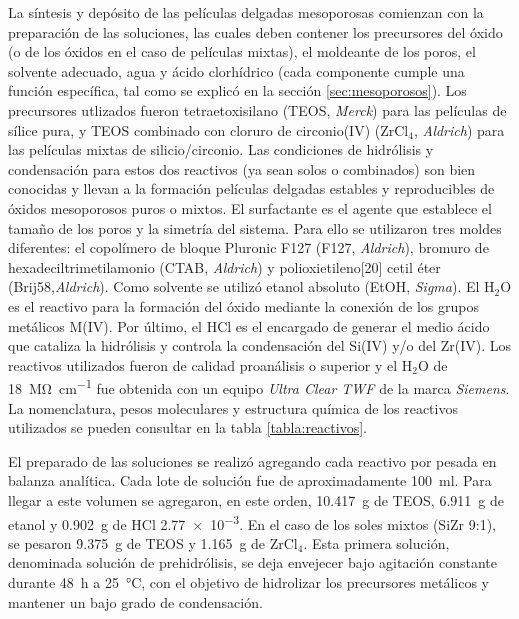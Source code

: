			La síntesis y depósito de las películas delgadas mesoporosas comienzan con la preparación de las soluciones, las cuales deben contener los precursores del óxido (o de los óxidos en el caso de películas mixtas), el moldeante de los poros, el solvente adecuado, agua y ácido clorhídrico\cite{Brinker1990} (cada componente cumple una función específica, tal como se explicó en la sección \ref{sec:mesoporosos}). Los precursores utlizados fueron tetraetoxisilano (TEOS, \textit{Merck}) para las películas de sílice pura, y TEOS combinado con cloruro de circonio(IV) (ZrCl$_4$, \textit{Aldrich}) para las películas mixtas de silicio/circonio. Las condiciones de hidrólisis y condensación para estos dos reactivos (ya sean solos o combinados) son bien conocidas y llevan a la formación películas delgadas estables y reproducibles de óxidos mesoporosos puros o mixtos\cite{Soler-Illia2004,Crepaldi2002a,Angelome2008}. El surfactante es el agente que establece el tamaño de los poros y la simetría del sistema. Para ello se utilizaron tres moldes diferentes: el copolímero de bloque Pluronic F127 (F127, \textit{Aldrich}), bromuro de hexadeciltrimetilamonio (CTAB, \textit{Aldrich}) y polioxietileno[20] cetil éter (Brij58,\textit{Aldrich}). Como solvente se utilizó etanol absoluto (EtOH, \textit{Sigma}). El H$_2$O es el reactivo para la formación del óxido mediante la conexión de los grupos metálicos M(IV). Por último, el HCl es el encargado de generar el medio ácido que cataliza la hidrólisis y controla la condensación del Si(IV) y/o del Zr(IV). Los reactivos utilizados fueron de calidad proanálisis o superior y el H$_2$O de \SI{18}{\mega\ohm\per\cm} fue obtenida con un equipo \textit{Ultra Clear TWF} de la marca \textit{Siemens}. La nomenclatura, pesos moleculares y estructura química de los reactivos utilizados se pueden consultar en la tabla \ref{tabla:reactivos}.
					
			El preparado de las soluciones se realizó agregando cada reactivo por pesada en balanza analítica. Cada lote de solución fue de aproximadamente \SI{100}{\ml}. Para llegar a este volumen se agregaron, en este orden, \SI{10.417}{\gram} de TEOS, \SI{6.911}{\gram} de etanol y \SI{0.902}{\gram} de HCl \SI{2,77e-3}{\Molar}. En el caso de los soles mixtos (Si\textbar Zr 9:1), se pesaron \SI{9.375}{\gram} de TEOS y \SI{1.165}{\gram} de ZrCl$_4$. Esta primera solución, denominada solución de prehidrólisis, se deja envejecer bajo agitación constante durante \SI{48}{\hour} a \SI{25}{\celsius}, con el objetivo de hidrolizar los precursores metálicos y mantener un bajo grado de condensación.\cite{Grosso2001}

